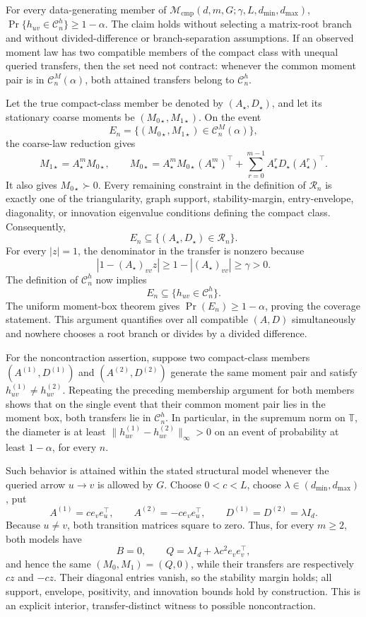 For every data-generating member of
\(\mathcal M_{\mathrm{cmp}}(d,m,G;\gamma,L,d_{\min},d_{\max})\),
\(\Pr\{h_{uv}\in\mathcal C_n^h\}\ge1-\alpha\). The claim holds without
selecting a matrix-root branch and without divided-difference or
branch-separation assumptions. If an observed moment law has two compatible
members of the compact class with unequal queried transfers, then the set
need not contract: whenever the common moment pair is in
\(\mathcal C_n^M(\alpha)\), both attained transfers belong to
\(\mathcal C_n^h\).

Let the true compact-class member be denoted by \((A_\star,D_\star)\), and
let its stationary coarse moments be \((M_{0\star},M_{1\star})\). On the
event
\[
 E_n=\{(M_{0\star},M_{1\star})\in\mathcal C_n^M(\alpha)\},
\]
the coarse-law reduction gives
\[
 M_{1\star}=A_\star^mM_{0\star},
 \qquad
 M_{0\star}=A_\star^mM_{0\star}(A_\star^m)^\top
 +\sum_{r=0}^{m-1}A_\star^rD_\star(A_\star^r)^\top.
\]
It also gives \(M_{0\star}\succ0\). Every remaining constraint in the
definition of \(\mathcal R_n\) is exactly one of the triangularity, graph
support, stability-margin, entry-envelope, diagonality, or innovation
eigenvalue conditions defining the compact class. Consequently,
\[
 E_n\subseteq\{(A_\star,D_\star)\in\mathcal R_n\}.
\]
For every \(|z|=1\), the denominator in the transfer is nonzero because
\[
 |1-(A_\star)_{vv}z|\ge1-| (A_\star)_{vv}|
 \ge\gamma>0.
\]
The definition of \(\mathcal C_n^h\) now implies
\[
 E_n\subseteq\{h_{uv}\in\mathcal C_n^h\}.
\]
The uniform moment-box theorem gives \(\Pr(E_n)\ge1-\alpha\), proving the
coverage statement. This argument quantifies over all compatible
\((A,D)\) simultaneously and nowhere chooses a root branch or divides by a
divided difference.

For the noncontraction assertion, suppose two compact-class members
\((A^{(1)},D^{(1)})\) and \((A^{(2)},D^{(2)})\) generate the same moment
pair and satisfy \(h_{uv}^{(1)}\ne h_{uv}^{(2)}\). Repeating the preceding
membership argument for both members shows that on the single event that
their common moment pair lies in the moment box, both transfers lie in
\(\mathcal C_n^h\). In particular, in the supremum norm on
\(\mathbb T\), the diameter is at least
\(\lVert h_{uv}^{(1)}-h_{uv}^{(2)}\rVert_\infty>0\) on an event of
probability at least \(1-\alpha\), for every \(n\).

Such behavior is attained within the stated structural model whenever the
queried arrow \(u\to v\) is allowed by \(G\). Choose
\(0<c<L\), choose \(\lambda\in(d_{\min},d_{\max})\), put
\[
 A^{(1)}=c e_ve_u^\top,
 \qquad A^{(2)}=-c e_ve_u^\top,
 \qquad D^{(1)}=D^{(2)}=\lambda I_d.
\]
Because \(u\ne v\), both transition matrices square to zero. Thus, for every
\(m\ge2\), both models have
\[
 B=0,
 \qquad
 Q=\lambda I_d+\lambda c^2e_ve_v^\top,
\]
and hence the same
\((M_0,M_1)=(Q,0)\), while their transfers are respectively \(cz\) and
\(-cz\). Their diagonal entries vanish, so the stability margin holds; all
support, envelope, positivity, and innovation bounds hold by construction.
This is an explicit interior, transfer-distinct witness to possible
noncontraction.

